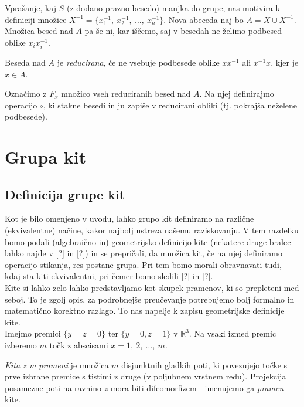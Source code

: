 \documentclass[mat1]{fmfdelo}
\newcommand{\R}{\mathbb R}
\begin{document}
Vprašanje, kaj $S$ (z dodano prazno besedo) manjka do grupe, nas motivira k definiciji množice $X^{-1} = \{x_1^{-1},\ x_2^{-1}, \ \ldots, \ x_n^{-1}\}$. Nova abeceda naj bo $A = X \cup X^{-1}$. Množica besed nad $A$ pa še ni, kar iščemo, saj v besedah ne želimo podbesed oblike $x_ix_i^{-1}$.

\begin{definicija}
Beseda nad $A$ je \emph{reducirana}, če ne vsebuje podbesede oblike $xx^{-1}$ ali $x^{-1}x$, kjer je $x\in A$.
\end{definicija}

Označimo z $F_x$ množico vseh reduciranih besed nad $A$. Na njej definirajmo operacijo $\circ$, ki stakne besedi in ju zapiše v reducirani obliki (tj. pokrajša neželene podbesede).

\section{Grupa kit}

\subsection{Definicija grupe kit}

Kot je bilo omenjeno v uvodu, lahko grupo kit definiramo na različne (ekvivalentne) načine, kakor najbolj ustreza našemu raziskovanju. V tem razdelku bomo podali (algebraično in) geometrijsko definicijo kite (nekatere druge bralec lahko najde v [?] in [?]) in se prepričali, da množica kit, če na njej definiramo operacijo stikanja, res postane grupa. Pri tem bomo morali obravnavati tudi, kdaj sta kiti ekvivalentni, pri čemer bomo sledili [?] in [?].\\
Kite si lahko zelo lahko predstavljamo kot skupek pramenov, ki so prepleteni med seboj. To je zgolj opis, za podrobnejše preučevanje potrebujemo bolj formalno in matematično korektno razlago. To nas napelje k zapisu geometrijske definicije kite.\\
Imejmo premici $\{y = z = 0\}$ ter $\{y = 0, z = 1\}$ v $\R^3$. Na vsaki izmed premic izberemo $m$ točk z abscisami $x=1,\ 2,\ \ldots,\ m$.

\begin{definicija}
\emph{Kita z m prameni} je množica $m$ disjunktnih gladkih poti, ki povezujejo točke s prve izbrane premice s tistimi z druge (v poljubnem vrstnem redu). Projekcija posamezne poti na ravnino $z$ mora biti difeomorfizem - imenujemo ga \emph{pramen} kite.
\end{definicija}
\end{document}
